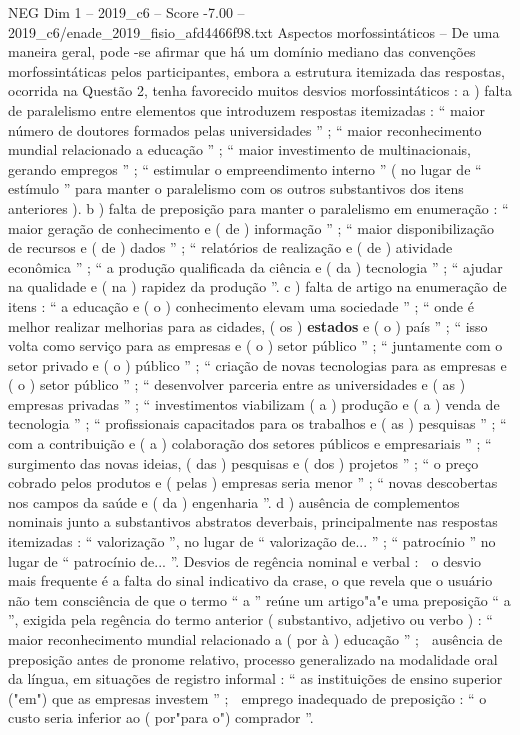 \begin{textsample}{NEG Dim 1 – 2019\_c6 – Score -7.00 – 2019\_c6/enade\_2019\_fisio\_afd4466f98.txt}
Aspectos morfossintáticos – De uma maneira geral, pode -se afirmar que há um domínio mediano das convenções morfossintáticas pelos participantes, embora a estrutura itemizada das respostas, ocorrida na Questão 2, tenha favorecido muitos desvios morfossintáticos : a ) falta de paralelismo entre elementos que introduzem respostas itemizadas : “ maior número de doutores formados pelas universidades ” ; “ maior reconhecimento mundial relacionado a educação ” ; “ maior investimento de multinacionais, gerando empregos ” ; “ estimular o empreendimento interno ” ( no lugar de “ estímulo ” para manter o paralelismo com os outros substantivos dos itens anteriores ). b ) falta de preposição para manter o paralelismo em enumeração : “ maior geração de conhecimento e ( de ) informação ” ; “ maior disponibilização de recursos e ( de ) dados ” ; “ relatórios de realização e ( de ) atividade econômica ” ; “ a produção qualificada da ciência e ( da ) tecnologia ” ; “ ajudar na qualidade e ( na ) rapidez da produção ”. c ) falta de artigo na enumeração de itens : “ a educação e ( o ) conhecimento elevam uma sociedade ” ; “ onde é melhor realizar melhorias para as cidades, ( os ) \textbf{estados} e ( o ) país ” ; “ isso volta como serviço para as empresas e ( o ) setor público ” ; “ juntamente com o setor privado e ( o ) público ” ; “ criação de novas tecnologias para as empresas e ( o ) setor público ” ; “ desenvolver parceria entre as universidades e ( as ) empresas privadas ” ; “ investimentos viabilizam ( a ) produção e ( a ) venda de tecnologia ” ; “ profissionais capacitados para os trabalhos e ( as ) pesquisas ” ; “ com a contribuição e ( a ) colaboração dos setores públicos e empresariais ” ; “ surgimento das novas ideias, ( das ) pesquisas e ( dos ) projetos ” ; “ o preço cobrado pelos produtos e ( pelas ) empresas seria menor ” ; “ novas descobertas nos campos da saúde e ( da ) engenharia ”. d ) ausência de complementos nominais junto a substantivos abstratos deverbais, principalmente nas respostas itemizadas : “ valorização ”, no lugar de “ valorização de... ” ; “ patrocínio ” no lugar de “ patrocínio de... ”.
Desvios de regência nominal e verbal :  o desvio mais frequente é a falta do sinal indicativo da crase, o que revela que o usuário não tem consciência de que o termo “ a ” reúne um artigo"a"e uma preposição “ a ”, exigida pela regência do termo anterior ( substantivo, adjetivo ou verbo ) : “ maior reconhecimento mundial relacionado a ( por à ) educação ” ;  ausência de preposição antes de pronome relativo, processo generalizado na modalidade oral da língua, em situações de registro informal : “ as instituições de ensino superior ("em") que as empresas investem ” ;  emprego inadequado de preposição : “ o custo seria inferior ao ( por"para o") comprador ”.

\end{textsample}
